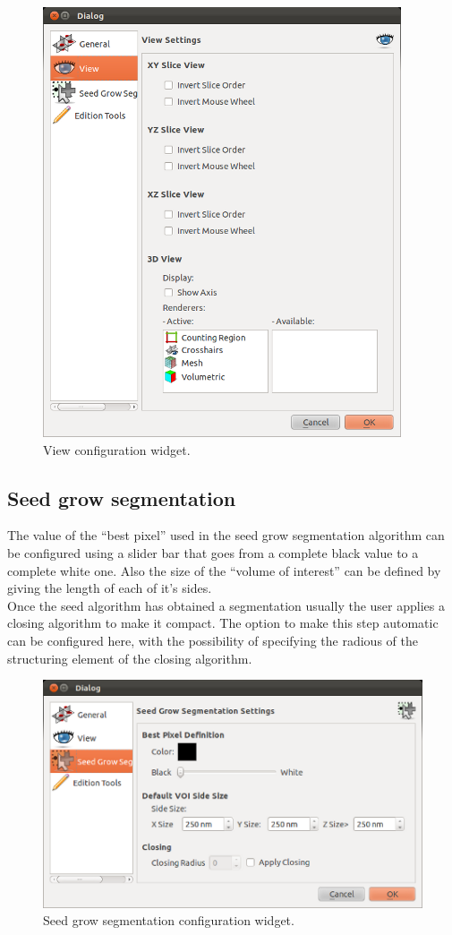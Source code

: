 \begin{figure}[H]
\centering
\includegraphics[scale=0.75]{fig/Configuration-view}
\caption{View configuration widget.}
\end{figure}

\subsection{Seed grow segmentation}

The value of the ``best pixel'' used in the seed grow segmentation algorithm can be configured using a slider bar that goes from a complete black value to a complete white one. Also the size of the ``volume of interest'' can be defined by giving the length of each of it's sides.\\
Once the seed algorithm has obtained a segmentation usually the user applies a closing algorithm to make it compact. The option to make this step automatic can be configured here, with the possibility of specifying the radious of the structuring element of the closing algorithm. 

\begin{figure}[H]
\centering
\includegraphics[scale=0.75]{fig/Configuration-seed}
\caption{Seed grow segmentation configuration widget.}
\end{figure}


